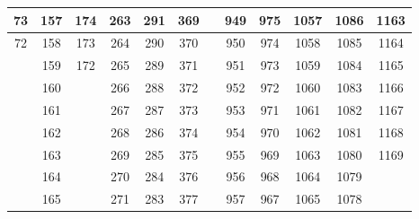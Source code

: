 \begin{table}
\begin{center}
{\begin{tabular} {| c | c | c | c | c | c | c | c | c | c | c | c | }
 73                      & 157                      &  174 & 263 & 291                      & 369                      &     & 949                      &  975                      & 1057 & 1086                       & 1163                      \\ \hline
 72                      & 158                      &  173 & 264 & 290                      & 370                      &     & 950                      &  974                      & 1058 & 1085                       & 1164                      \\ \hline
                         & 159                      &  172 & 265 & 289                      & 371                      &     & 951                      &  973                      & 1059 & 1084                       & 1165                      \\ \hline
                         & 160                      &      & 266 & 288                      & 372                      &     & 952                      &  972                      & 1060 & 1083                       & 1166                      \\ \hline
                         & 161                      &      & 267 & 287                      & 373                      &     & 953                      &  971                      & 1061 & 1082                       & 1167                      \\ \hline
                         & 162                      &      & 268 & 286                      & 374                      &     & 954                      &  970                      & 1062 & 1081                       & 1168                      \\ \hline
                         & 163                      &      & 269 & 285                      & 375                      &     & 955                      &  969                      & 1063 & 1080                       & 1169                      \\ \hline
                         & 164                      &      & 270 & 284                      & 376                      &     & 956                      &  968                      & 1064 & 1079                       &                           \\ \hline
                         & 165                      &      & 271 & 283                      & 377                      &     & 957                      &  967                      & 1065 & 1078                       &                           \\ \hline

\end{tabular}}
\end{center}
\end{table}
